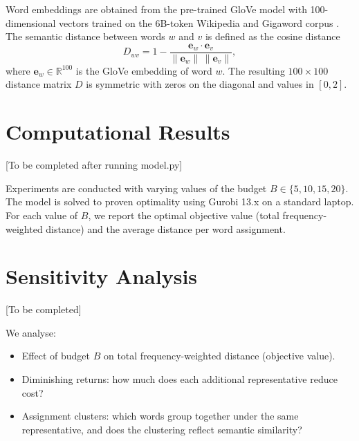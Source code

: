 \documentclass[11pt]{article}
\begin{document}
Word embeddings are obtained from the pre-trained GloVe model with
100-dimensional vectors trained on the 6B-token Wikipedia and Gigaword corpus
\citep{pennington2014}.
The semantic distance between words $w$ and $v$ is defined as the cosine distance
\begin{equation}
    D_{wv} = 1 - \frac{\mathbf{e}_w \cdot \mathbf{e}_v}
                      {\|\mathbf{e}_w\|\,\|\mathbf{e}_v\|},
    \label{eq:dist}
\end{equation}
where $\mathbf{e}_w \in \mathbb{R}^{100}$ is the GloVe embedding of word $w$.
The resulting $100 \times 100$ distance matrix $D$ is symmetric with zeros on
the diagonal and values in $[0, 2]$.

\section{Computational Results}\label{sec:results}

[To be completed after running model.py]

Experiments are conducted with varying values of the budget $B \in \{5, 10, 15, 20\}$.
The model is solved to proven optimality using Gurobi 13.x on a standard laptop.
For each value of $B$, we report the optimal objective value (total frequency-weighted
distance) and the average distance per word assignment.

\section{Sensitivity Analysis}\label{sec:sensitivity}

[To be completed]

We analyse:
\begin{itemize}
    \item Effect of budget $B$ on total frequency-weighted distance (objective value).
    \item Diminishing returns: how much does each additional representative reduce cost?
    \item Assignment clusters: which words group together under the same representative,
          and does the clustering reflect semantic similarity?
\end{itemize}
\end{document}
